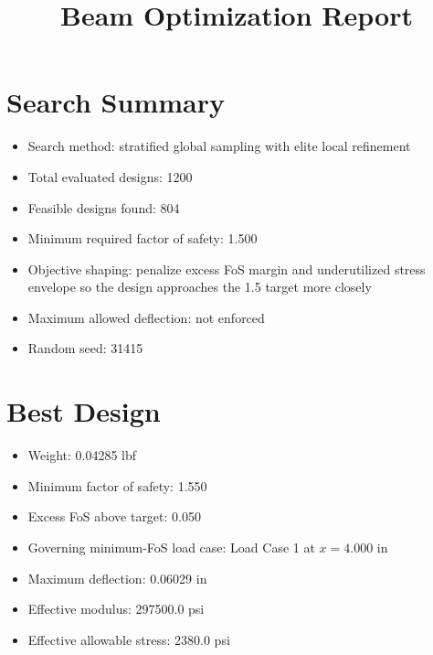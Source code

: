 \documentclass[11pt]{article}
\title{Beam Optimization Report}
\date{}
\begin{document}
\maketitle

\section*{Search Summary}
\begin{itemize}
\item Search method: stratified global sampling with elite local refinement
\item Total evaluated designs: 1200
\item Feasible designs found: 804
\item Minimum required factor of safety: 1.500
\item Objective shaping: penalize excess FoS margin and underutilized stress envelope so the design approaches the 1.5 target more closely
\item Maximum allowed deflection: not enforced
\item Random seed: 31415
\end{itemize}

\section*{Best Design}
\begin{itemize}
\item Weight: 0.04285 lbf
\item Minimum factor of safety: 1.550
\item Excess FoS above target: 0.050
\item Governing minimum-FoS load case: Load Case 1 at $x=4.000$ in
\item Maximum deflection: 0.06029 in
\item Effective modulus: 297500.0 psi
\item Effective allowable stress: 2380.0 psi
\end{itemize}
\end{document}
